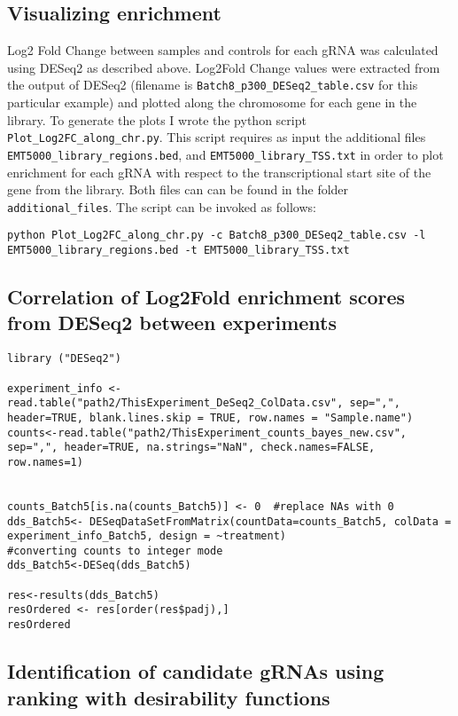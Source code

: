 \subsection{Visualizing enrichment}
Log2 Fold Change between samples and controls for each gRNA was calculated using DESeq2 as described above. Log2Fold Change values were extracted from the output of DESeq2 (filename is \verb|Batch8_p300_DESeq2_table.csv| for this particular example) and plotted along the chromosome for each gene in the library. To generate the plots I wrote the python script \verb|Plot_Log2FC_along_chr.py|. This script requires as input the additional files \verb|EMT5000_library_regions.bed|, and \verb|EMT5000_library_TSS.txt| in order to plot enrichment for each gRNA with respect to the transcriptional start site of the gene from the library. Both files can can be found in the folder \verb|additional_files|. The script can be invoked as follows:

\begin{small}\begin{lstlisting}
python Plot_Log2FC_along_chr.py -c Batch8_p300_DESeq2_table.csv -l EMT5000_library_regions.bed -t EMT5000_library_TSS.txt
\end{lstlisting}\end{small}

\subsection{Correlation of Log2Fold enrichment scores from DESeq2 between experiments}

\begin{small}\begin{lstlisting}
library ("DESeq2")

experiment_info <- read.table("path2/ThisExperiment_DeSeq2_ColData.csv", sep=",", header=TRUE, blank.lines.skip = TRUE, row.names = "Sample.name")
counts<-read.table("path2/ThisExperiment_counts_bayes_new.csv", sep=",", header=TRUE, na.strings="NaN", check.names=FALSE, row.names=1)


counts_Batch5[is.na(counts_Batch5)] <- 0  #replace NAs with 0
dds_Batch5<- DESeqDataSetFromMatrix(countData=counts_Batch5, colData = experiment_info_Batch5, design = ~treatment)
#converting counts to integer mode
dds_Batch5<-DESeq(dds_Batch5)

res<-results(dds_Batch5)
resOrdered <- res[order(res$padj),]
resOrdered
\end{lstlisting}\end{small}



\subsection{Identification of candidate gRNAs using ranking with desirability functions}




